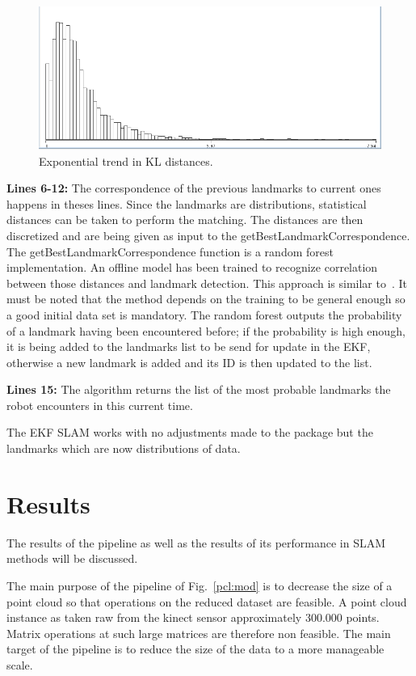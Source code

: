 \documentclass[twoside,hidelinks]{article}
\begin{document}
\begin{figure}[h!]
  \centering
    \includegraphics[width=1\textwidth]{Kullback-Leibler}
    \caption{Exponential trend in KL distances.}
  \label{pcl:kl}
\end{figure}


\textbf{Lines 6-12:} The correspondence of the previous landmarks to current ones happens in theses lines. Since the landmarks are distributions, statistical distances can be taken to perform the matching. The distances are then discretized and are being given as input to the getBestLandmarkCorrespondence. The getBestLandmarkCorrespondence function is a random forest implementation. An offline model has been trained to recognize correlation between those distances and landmark detection. This approach is similar to~\cite{objectDisc}. It must be noted that the method depends on the training to be general enough so a good initial data set is mandatory. The random forest outputs the probability of a landmark having been encountered before; if the probability is high enough, it is being added to the landmarks list to be send for update in the EKF, otherwise a new landmark is added and its ID is then updated to the list.

\textbf{Lines 15:} The algorithm returns the list of the most probable landmarks the robot encounters in this current time.


The EKF SLAM works with no adjustments made to the package but the landmarks which are now distributions of data.

\section{Results}
\label{sec:results}

The results of the pipeline as well as the results of its performance in SLAM methods will be discussed.

The main purpose of the pipeline of Fig.~\ref{pcl:mod} is to decrease the size of a point cloud so that operations on the reduced dataset are feasible. A point cloud instance as taken raw from the kinect sensor approximately 300.000 points. Matrix operations at such large matrices are therefore non feasible. The main target of the pipeline is to reduce the size of the data to a more manageable scale. 
\end{document}
